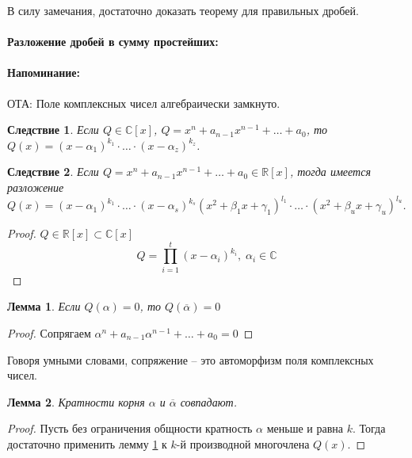 \documentclass{article}
\theoremstyle{plain}
\newtheorem{lemma}{Лемма}
\newtheorem{corollary}{Следствие}
\theoremstyle{definition}
\theoremstyle{remark}
\renewcommand{\*}{\cdot}
\begin{document}
В силу замечания, достаточно доказать теорему для правильных дробей.
\paragraph{Разложение дробей в сумму простейших:} 
\paragraph{Напоминание:} ОТА: Поле комплексных чисел алгебраически замкнуто.
\begin{corollary}
Если $Q\in \mathbb{C}[x]$, $Q=x^n + a_{n-1}x^{n-1} + \ldots + a_0$, то $Q(x) = (x-\alpha_1)^{k_1}\cdot \ldots \cdot (x-\alpha_z)^{k_z}$.
\end{corollary} 

\begin{corollary} Если $Q=x^n + a_{n-1}x^{n-1} + \ldots + a_0 \in \mathbb{R}[x]$, тогда имеется разложение $Q(x) = (x-\alpha_1)^{k_1}\cdot \ldots \cdot (x-\alpha_s)^{k_s}(x^2+\beta_1x+\gamma_1)^{l_1} \cdot \ldots \cdot (x^2+\beta_{u}x+\gamma_{u})^{l_{u}}$. \end{corollary} 

\begin{proof}
$Q \in \mathbb{R}[x] \subset \mathbb{C}[x]$
$$Q = \prod_{i = 1}^{t}(x - \alpha_i)^{k_i},\;\alpha_i \in \mathbb{C}$$
\end{proof}

\begin{lemma}\label{l:conj}
Если $Q(\alpha) = 0$, то $Q(\overline{\alpha}) = 0$
\end{lemma}

\begin{proof}
Сопрягаем  $\alpha^n + a_{n-1}\alpha^{n-1} + \ldots + a_0 = 0$
\end{proof}

Говоря умными словами, сопряжение -- это автоморфизм поля комплексных чисел.

\begin{lemma}
Кратности корня $\alpha$ и $\overline{\alpha}$ совпадают.
\end{lemma}

\begin{proof}
Пусть без ограничения общности кратность $\alpha$ меньше и равна $k$.
Тогда достаточно применить лемму \ref{l:conj} к $k$-й производной многочлена $Q(x)$.
\end{proof}
\end{document}
